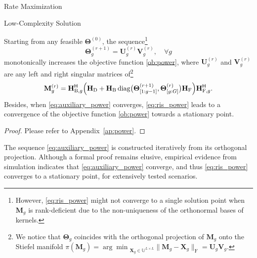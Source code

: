 \documentclass[journal]{IEEEtran}
\begin{document}
\begin{section}{Rate Maximization}
\begin{subsection}{Low-Complexity Solution}
		\begin{proposition}
			\label{pp:power}
			Starting from any feasible $\mathbf{\Theta}^{(0)}$, the sequence\footnote{However, \eqref{eq:ris_power} might not converge to a single solution point when $\mathbf{M}_g$ is rank-deficient due to the non-uniqueness of the orthonormal bases of kernels.}
			\begin{equation}
				\label{eq:ris_power}
				\mathbf{\Theta}_g^{(r+1)} = \mathbf{U}_g^{(r)} \mathbf{V}_g^{(r)}, \quad \forall g
			\end{equation}
			monotonically increases the objective function \eqref{ob:power},
			where $\mathbf{U}_g^{(r)}$ and $\mathbf{V}_g^{(r)}$ are any left and right singular matrices of\footnote{We notice that $\mathbf{\Theta}_g$ coincides with the orthogonal projection of $\mathbf{M}_g$ onto the Stiefel manifold $\pi(\mathbf{M}_g) = {\arg\min}_{\mathbf{X}_g \in \mathbb{U}^{L \times L}} \lVert \mathbf{M}_g - \mathbf{X}_g \rVert _\mathrm{F} = \mathbf{U}_g \mathbf{V}_g$.} %
			\begin{equation}
				\label{eq:auxiliary_power}
				\mathbf{M}_g^{(r)} = \mathbf{H}_{\mathrm{B},g}^\mathsf{H} \Bigl(\mathbf{H}_\mathrm{D} + \mathbf{H}_\mathrm{B} \operatorname{diag}\bigl(\mathbf{\Theta}_{[1:g-1]}^{(r+1)},\mathbf{\Theta}_{[g:G]}^{(r)}\bigr) \mathbf{H}_\mathrm{F}\Bigr) \mathbf{H}_{\mathrm{F},g}^\mathsf{H}.
			\end{equation}
			Besides, when \eqref{eq:auxiliary_power} converges, \eqref{eq:ris_power} leads to a convergence of the objective function \eqref{ob:power} towards a stationary point.
		\end{proposition}

		\begin{proof}
			Please refer to Appendix~\ref{ap:power}.
		\end{proof}

		\begin{remark}
			\label{re:power}
			The sequence \eqref{eq:auxiliary_power} is constructed iteratively from its orthogonal projection.
			Although a formal proof remains elusive, empirical evidence from simulation indicates that \eqref{eq:auxiliary_power} converge, and thus \eqref{eq:ris_power} converges to a stationary point, for extensively tested scenarios.
		\end{remark}


\end{subsection}
\end{section}
\end{document}
